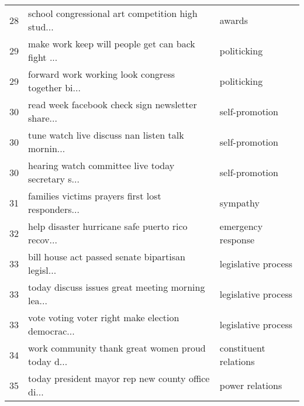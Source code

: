\begin{tabular}{lll}
28          &  school congressional art competition high stud... &                 awards \\
29          &  make work keep will people get can back fight ... &            politicking \\
29          &  forward work working look congress together bi... &            politicking \\
30          &  read week facebook check sign newsletter share... &         self-promotion \\
30          &  tune watch live discuss nan listen talk mornin... &         self-promotion \\
30          &  hearing watch committee live today secretary s... &         self-promotion \\
31          &  families victims prayers first lost responders... &               sympathy \\
32          &  help disaster hurricane safe puerto rico recov... &     emergency response \\
33          &  bill house act passed senate bipartisan legisl... &    legislative process \\
33          &  today discuss issues great meeting morning lea... &    legislative process \\
33          &  vote voting voter right make election democrac... &    legislative process \\
34          &  work community thank great women proud today d... &  constituent relations \\
35          &  today president mayor rep new county office di... &        power relations \\
\bottomrule
\end{tabular}

